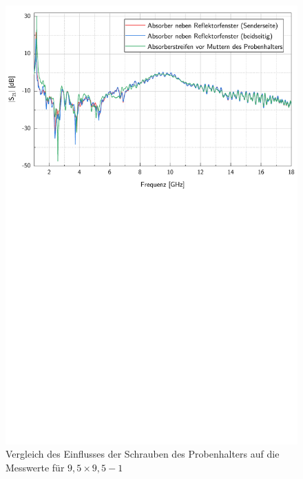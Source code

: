 \begin{figure}[ht]
    \centering
    \includegraphics[page = 3, width = .99\textwidth, trim = 0cm 14.3cm 0cm 0cm, clip]{Abbildungen/Kapitel4/Messergebnisse/9k5x9k5-1.pdf}
    \caption[Vergleich des Einflusses der Schrauben des Probenhalters auf die Messwerte]{Vergleich des Einflusses der Schrauben des Probenhalters auf die Messwerte für \mbox{$9,5\times9,5-1$}}
    \label{fig:4_9k5x9k5-1_Schrauben}
\end{figure}


